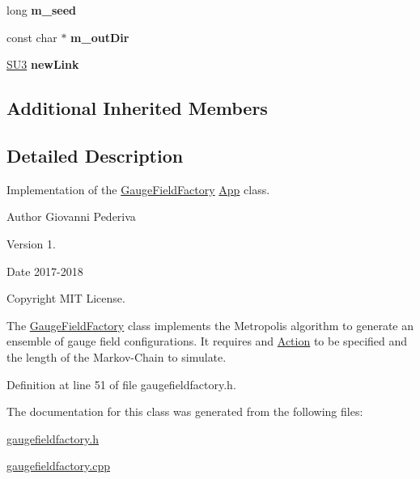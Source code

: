 \begin{DoxyCompactItemize}
\item 
long {\bfseries m\+\_\+seed}\hypertarget{classGaugeFieldFactory_a56f0e062cd0cb3d73b487891ccb67462}{}\label{classGaugeFieldFactory_a56f0e062cd0cb3d73b487891ccb67462}

\item 
const char $\ast$ {\bfseries m\+\_\+out\+Dir}\hypertarget{classGaugeFieldFactory_ad231575f1bf834b20ff5e948331b748c}{}\label{classGaugeFieldFactory_ad231575f1bf834b20ff5e948331b748c}

\item 
\hyperlink{structSU3}{S\+U3} {\bfseries new\+Link}\hypertarget{classGaugeFieldFactory_af15971c810e2e4cee7de71e9560b16fc}{}\label{classGaugeFieldFactory_af15971c810e2e4cee7de71e9560b16fc}

\end{DoxyCompactItemize}
\subsection*{Additional Inherited Members}


\subsection{Detailed Description}
Implementation of the \hyperlink{classGaugeFieldFactory}{Gauge\+Field\+Factory} \hyperlink{classApp}{App} class. 

\begin{DoxyAuthor}{Author}
Giovanni Pederiva 
\end{DoxyAuthor}
\begin{DoxyVersion}{Version}
1. 
\end{DoxyVersion}
\begin{DoxyDate}{Date}
2017-\/2018 
\end{DoxyDate}
\begin{DoxyCopyright}{Copyright}
M\+IT License.
\end{DoxyCopyright}
The \hyperlink{classGaugeFieldFactory}{Gauge\+Field\+Factory} class implements the Metropolis algorithm to generate an ensemble of gauge field configurations. It requires and \hyperlink{classAction}{Action} to be specified and the length of the Markov-\/\+Chain to simulate. 

Definition at line 51 of file gaugefieldfactory.\+h.



The documentation for this class was generated from the following files\+:\begin{DoxyCompactItemize}
\item 
\hyperlink{gaugefieldfactory_8h}{gaugefieldfactory.\+h}\item 
\hyperlink{gaugefieldfactory_8cpp}{gaugefieldfactory.\+cpp}\end{DoxyCompactItemize}
